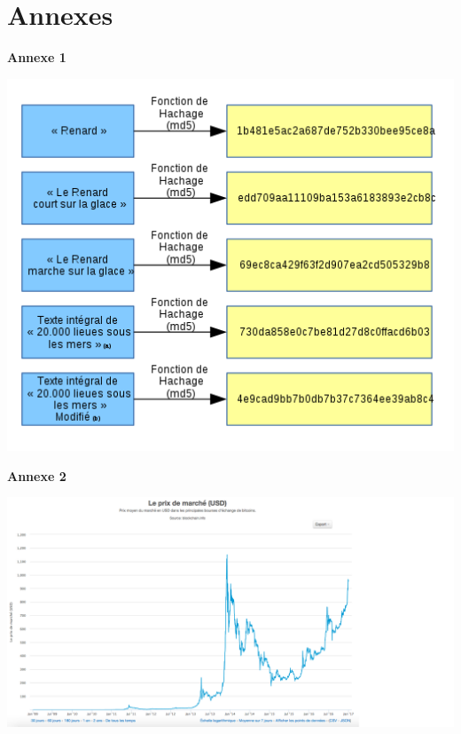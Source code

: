 \documentclass[12pt]{report}
\begin{document}
\newpage
\section{Annexes}

\textbf{Annexe 1}\\
\begin{center}
    \includegraphics[width=1.2\textwidth]{hashage}
\end{center}

\newpage
\textbf{Annexe 2}\\
\begin{center}
    \includegraphics[width=1.3\textwidth]{courbeBTC}
\end{center}
\end{document}
